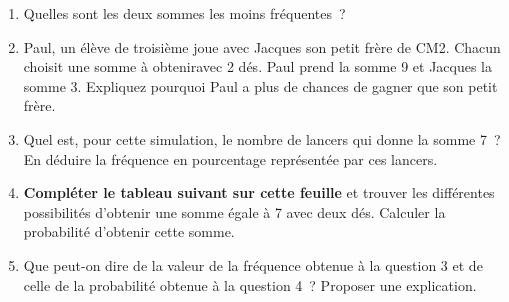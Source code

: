 \documentclass[exercice]{thedocument}%
\begin{document}
\begin{enumerate}
    \item Quelles sont les deux sommes les moins fréquentes~?
    \item Paul, un élève de troisième joue avec Jacques son petit frère de CM2.
    Chacun choisit une somme à obteniravec 2 dés. Paul prend la somme 9
    et Jacques la somme 3.\vskip10pt Expliquez pourquoi Paul a plus de chances
    de gagner que son petit frère.
    \item Quel est, pour cette simulation, le nombre de lancers qui donne la
    somme 7~? En déduire la fréquence en pourcentage représentée par ces lancers.
    \item {\bfseries Compléter le tableau suivant sur cette feuille} et trouver les
    différentes possibilités d'obtenir une somme égale à 7 avec deux dés. Calculer
    la probabilité d'obtenir cette somme.
    \par\noindent\centering{}\par\noindent
    \item Que peut-on dire de la valeur de la fréquence obtenue à la question 3
    et de celle de la probabilité obtenue à la question 4~? Proposer une
    explication.
\end{enumerate}
\end{document}
